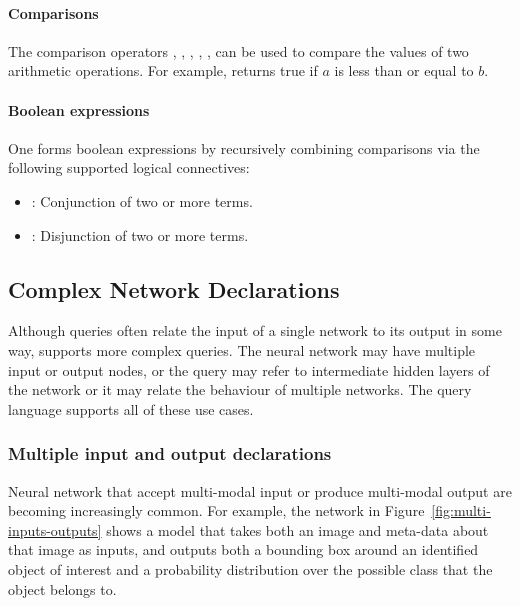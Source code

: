 \paragraph{Comparisons}

The comparison operators \inlinevnn{<=}, \inlinevnn{>=}, \inlinevnn{<}, \inlinevnn{>}, \inlinevnn{=}, \inlinevnn{!=} can be used to compare the values of two arithmetic operations.
For example,  returns true if $a$ is less than or equal to $b$.
    
\paragraph{Boolean expressions} 

One forms boolean expressions by recursively combining comparisons via the following supported logical connectives:
\begin{itemize}
    \item {}: Conjunction of two or more terms.
    \item {}: Disjunction of two or more terms.
\end{itemize}

\subsection{Complex Network Declarations}
\label{sec:complex-networks-decls}

Although queries often relate the input of a single network to its output in some way, \vnnlib{} supports more complex queries. The neural network may have multiple input or output nodes, or the query may refer to intermediate hidden layers of the network or it may relate the behaviour of multiple networks. The query language supports all of these use cases.

\subsubsection{Multiple input and output declarations}

Neural network that accept multi-modal input or produce multi-modal output are becoming increasingly common. 
For example, the network in Figure~\ref{fig:multi-inputs-outputs} shows a model that takes both an image and meta-data about that image as inputs, and outputs both a bounding box around an identified object of interest and a probability distribution over the possible class that the object belongs to. 

